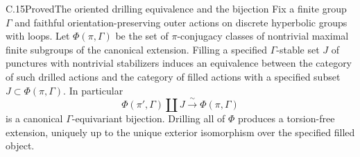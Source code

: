 \begin{claim}{C.15}{Proved}{The oriented drilling equivalence and the bijection}
Fix a finite group $\Gamma$ and faithful orientation-preserving outer
actions on discrete hyperbolic groups with loops. Let $\Phi(\pi,\Gamma)$
be the set of $\pi$-conjugacy classes of nontrivial maximal finite
subgroups of the canonical extension. Filling a specified
$\Gamma$-stable set $J$ of punctures with nontrivial stabilizers induces
an equivalence between the category of such drilled actions and the
category of filled actions with a specified subset
$J\subset\Phi(\pi,\Gamma)$. In particular
\[
 \Phi(\pi',\Gamma)\amalg J\xrightarrow{\ \sim\ }\Phi(\pi,\Gamma)
\]
is a canonical $\Gamma$-equivariant bijection. Drilling all of $\Phi$
produces a torsion-free extension, uniquely up to the unique exterior
isomorphism over the specified filled object.
\end{claim}
